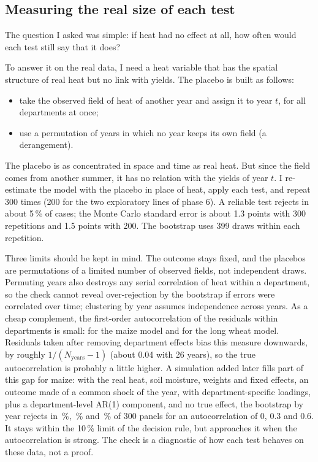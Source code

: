 \subsection{Measuring the real size of each test}

The question I asked was simple: if heat had no effect at all, how often would each test still say that it does?

To answer it on the real data, I need a heat variable that has the spatial structure of real heat but no link with yields. The placebo is built as follows:
\begin{itemize}
  \item take the observed field of heat of another year and assign it to year $t$, for all departments at once;
  \item use a permutation of years in which no year keeps its own field (a derangement).
\end{itemize}
The placebo is as concentrated in space and time as real heat. But since the field comes from another summer, it has no relation with the yields of year $t$. I re-estimate the model with the placebo in place of heat, apply each test, and repeat 300 times (200 for the two exploratory lines of phase 6). A reliable test rejects in about 5\,\% of cases; the Monte Carlo standard error is about 1.3 points with 300 repetitions and 1.5 points with 200. The bootstrap uses 399 draws within each repetition.

Three limits should be kept in mind. The outcome stays fixed, and the placebos are permutations of a limited number of observed fields, not independent draws. Permuting years also destroys any serial correlation of heat within a department, so the check cannot reveal over-rejection by the bootstrap if errors were correlated over time; clustering by year assumes independence across years. As a cheap complement, the first-order autocorrelation of the residuals within departments is small: \ArMaize{} for the maize model and \ArWheat{} for the long wheat model. Residuals taken after removing department effects bias this measure downwards, by roughly $1/(N_{\text{years}}-1)$ (about 0.04 with 26 years), so the true autocorrelation is probably a little higher. A simulation added later fills part of this gap for maize: with the real heat, soil moisture, weights and fixed effects, an outcome made of a common shock of the year, with department-specific loadings, plus a department-level AR(1) component, and no true effect, the bootstrap by year rejects in \SerialSizeZero\,\%, \SerialSizeLow\,\% and \SerialSizeHigh\,\% of 300 panels for an autocorrelation of 0, 0.3 and 0.6. It stays within the 10\,\% limit of the decision rule, but approaches it when the autocorrelation is strong. The check is a diagnostic of how each test behaves on these data, not a proof.

